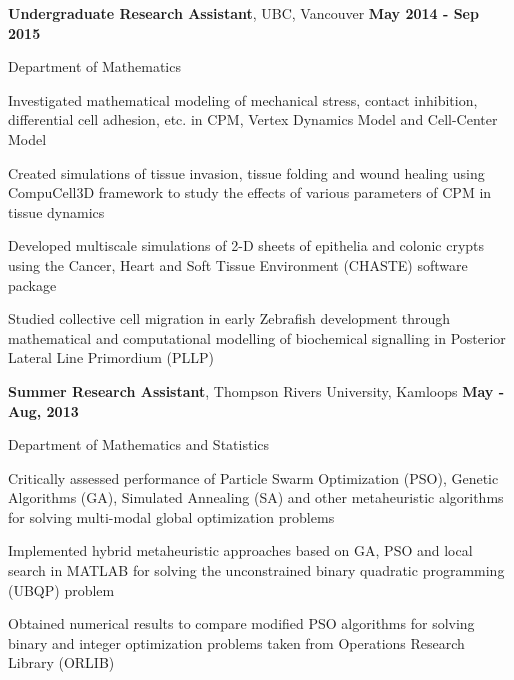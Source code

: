 \documentclass[margin,line]{res}
\newenvironment{list1}{
  \begin{list}{\ding{113}}{
      \setlength{\itemsep}{0in}
      \setlength{\parsep}{0in} \setlength{\parskip}{0in}
      \setlength{\topsep}{0in} \setlength{\partopsep}{0in} 
      \setlength{\leftmargin}{0.17in}}}{\end{list}}
\newenvironment{list3}{
  \begin{list}{\textopenbullet}{
      \setlength{\itemsep}{0in}
      \setlength{\parsep}{0in} \setlength{\parskip}{0in}
      \setlength{\topsep}{0in} \setlength{\partopsep}{0in} 
      \setlength{\leftmargin}{0.1in}}}{\end{list}}
\begin{document}
\begin{resume}
{\bf Undergraduate Research Assistant}, UBC, Vancouver \hfill {\bf May 2014 - Sep 2015}\\
\vspace*{-.2cm}
\begin{list1}
\item[] Department of Mathematics
\vspace*{.1cm}
\begin{list3}
\item Investigated mathematical modeling of mechanical stress, contact inhibition, differential cell adhesion, etc. in CPM, Vertex Dynamics Model and Cell-Center Model
\item Created simulations of tissue invasion, tissue folding and wound healing using CompuCell3D framework to study the effects of various parameters of CPM in tissue dynamics
\item Developed multiscale simulations of 2-D sheets of epithelia and colonic crypts using the Cancer, Heart and Soft Tissue Environment (CHASTE) software package
\item Studied collective cell migration in early Zebrafish development through mathematical and computational modelling of biochemical signalling in Posterior Lateral Line Primordium (PLLP)
\end{list3}
\end{list1}
\vspace*{.2cm}

{\bf Summer Research Assistant}, Thompson Rivers University, Kamloops \hfill {\bf May - Aug, 2013}\\
\vspace*{-.2cm}
\begin{list1}
\item[] Department of Mathematics and Statistics
\vspace*{.1cm}
\begin{list3}
\item Critically assessed performance of Particle Swarm Optimization (PSO), Genetic Algorithms (GA), Simulated Annealing (SA) and other metaheuristic algorithms for solving multi-modal global optimization problems
\item Implemented hybrid metaheuristic approaches based on GA, PSO and local search in MATLAB for solving the unconstrained binary quadratic programming (UBQP) problem
\item Obtained numerical results to compare modified PSO algorithms for solving binary and integer optimization problems taken from Operations Research Library (ORLIB)
\end{list3}
\end{list1}


\end{resume}
\end{document}
